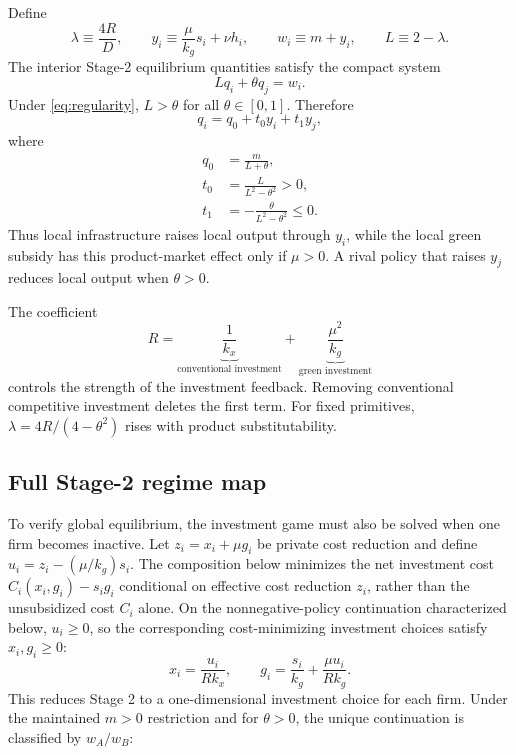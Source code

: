Define
\begin{equation}
\lambda\equiv\frac{4R}{D},
\qquad
y_i\equiv\frac{\mu}{k_g}s_i+\nu h_i,
\qquad
w_i\equiv m+y_i,
\qquad
L\equiv2-\lambda.
\label{eq:lambda-y}
\end{equation}
The interior Stage-2 equilibrium quantities satisfy the compact system
\begin{equation}
Lq_i+\theta q_j=w_i.
\label{eq:reduced-output-system}
\end{equation}
Under \eqref{eq:regularity}, $L>\theta$ for all $\theta\in[0,1]$. Therefore
\begin{equation}
q_i=q_0+t_0y_i+t_1y_j,
\label{eq:q-linear-policies}
\end{equation}
where
\begin{align}
q_0&=\frac{m}{L+\theta},\\
t_0&=\frac{L}{L^2-\theta^2}>0,\\
t_1&=-\frac{\theta}{L^2-\theta^2}\leq0.
\label{eq:t0t1}
\end{align}
Thus local infrastructure raises local output through $y_i$, while the local green subsidy has this product-market effect only if $\mu>0$. A rival policy that raises $y_j$ reduces local output when $\theta>0$.

The coefficient
\begin{equation}
R=\underbrace{\frac1{k_x}}_{\text{conventional investment}}
+\underbrace{\frac{\mu^2}{k_g}}_{\text{green investment}}
\end{equation}
controls the strength of the investment feedback. Removing conventional competitive investment deletes the first term. For fixed primitives, $\lambda=4R/(4-\theta^2)$ rises with product substitutability.

\subsection{Full Stage-2 regime map}

To verify global equilibrium, the investment game must also be solved when one firm becomes inactive. Let $z_i=x_i+\mu g_i$ be private cost reduction and define $u_i=z_i-(\mu/k_g)s_i$. The composition below minimizes the net investment cost $C_i(x_i,g_i)-s_i g_i$ conditional on effective cost reduction $z_i$, rather than the unsubsidized cost $C_i$ alone. On the nonnegative-policy continuation characterized below, $u_i\geq0$, so the corresponding cost-minimizing investment choices satisfy $x_i,g_i\geq0$:
\begin{equation}
x_i=\frac{u_i}{Rk_x},
\qquad
g_i=\frac{s_i}{k_g}+\frac{\mu u_i}{Rk_g}.
\label{eq:scalar-investment-composition}
\end{equation}
This reduces Stage 2 to a one-dimensional investment choice for each firm. Under the maintained $m>0$ restriction and for $\theta>0$, the unique continuation is classified by $w_A/w_B$:

